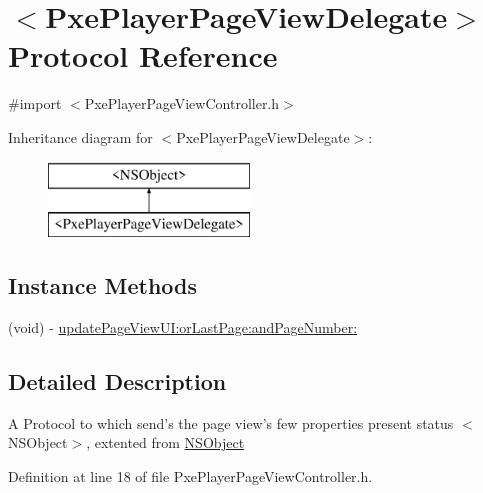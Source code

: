 \hypertarget{protocol_pxe_player_page_view_delegate-p}{\section{$<$Pxe\-Player\-Page\-View\-Delegate$>$ Protocol Reference}
\label{protocol_pxe_player_page_view_delegate-p}
}


{\ttfamily \#import $<$Pxe\-Player\-Page\-View\-Controller.\-h$>$}

Inheritance diagram for $<$Pxe\-Player\-Page\-View\-Delegate$>$\-:\begin{figure}[H]
\begin{center}
\leavevmode
\includegraphics[height=2.000000cm]{protocol_pxe_player_page_view_delegate-p}
\end{center}
\end{figure}
\subsection*{Instance Methods}
\begin{DoxyCompactItemize}
\item 
(void) -\/ \hyperlink{protocol_pxe_player_page_view_delegate-p_aeaaaa9ea06735b83f38baf406f7772e4}{update\-Page\-View\-U\-I\-:or\-Last\-Page\-:and\-Page\-Number\-:}
\end{DoxyCompactItemize}


\subsection{Detailed Description}
A Protocol to which send's the page view's few properties present status  $<$\-N\-S\-Object$>$, extented from \hyperlink{class_n_s_object-p}{N\-S\-Object} 

Definition at line 18 of file Pxe\-Player\-Page\-View\-Controller.\-h.



